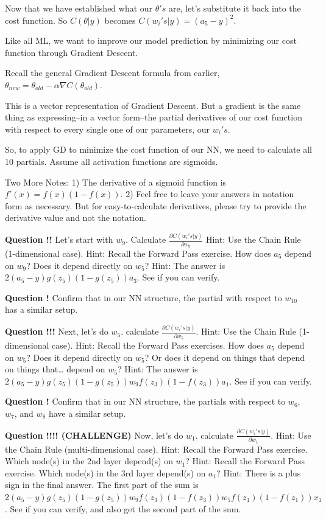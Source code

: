 \documentclass[
]{article}
\begin{document}
Now that we have established what our \(\theta's\) are, let's substitute
it back into the cost function. So \(C(\theta|y)\) becomes
\(C(w_i's|y) = (a_5 - y)^2\).

Like all ML, we want to improve our model prediction by minimizing our
cost function through Gradient Descent.

Recall the general Gradient Descent formula from earlier,
\(\theta_{new} = \theta_{old} - \alpha \nabla C(\theta_{old})\).

This is a vector representation of Gradient Descent. But a gradient is
the same thing as expressing--in a vector form--the partial derivatives
of our cost function with respect to every single one of our parameters,
our \(w_i's\).

So, to apply GD to minimize the cost function of our NN, we need to
calculate all 10 partials. Assume all activation functions are sigmoids.

Two More Notes: 1) The derivative of a sigmoid function is
\(f'(x) = f(x)(1-f(x))\). 2) Feel free to leave your answers in notation
form as necessary. But for easy-to-calculate derivatives, please try to
provide the derivative value and not the notation.

\textbf{Question !!} Let's start with \(w_9\). Calculate
\(\frac{\partial C(w_i's|y)}{\partial w_9}\) Hint: Use the Chain Rule
(1-dimensional case). Hint: Recall the Forward Pass exercise. How does
\(a_5\) depend on \(w_9\)? Does it depend directly on \(w_5\)? Hint: The
answer is \(2(a_5-y)g(z_5)(1-g(z_5))a_3\). See if you can verify.

\textbf{Question !} Confirm that in our NN structure, the partial with
respect to \(w_{10}\) has a similar setup.

\textbf{Question !!!} Next, let's do \(w_5\). calculate
\(\frac{\partial C(w_i's|y)}{\partial w_5}\). Hint: Use the Chain Rule
(1-dimensional case). Hint: Recall the Forward Pass exercises. How does
\(a_5\) depend on \(w_5\)? Does it depend directly on \(w_5\)? Or does
it depend on things that depend on things that\ldots{} depend on
\(w_5\)? Hint: The answer is
\(2(a_5-y)g(z_5)(1-g(z_5))w_9f(z_3)(1-f(z_3))a_1\). See if you can
verify.

\textbf{Question !} Confirm that in our NN structure, the partials with
respect to \(w_6\), \(w_7\), and \(w_8\) have a similar setup.

\textbf{Question !!!! (CHALLENGE)} Now, let's do \(w_1\). calculate
\(\frac{\partial C(w_i's|y)}{\partial w_1}\). Hint: Use the Chain Rule
(multi-dimensional case). Hint: Recall the Forward Pass exercise. Which
node(s) in the 2nd layer depend(s) on \(w_1\)? Hint: Recall the Forward
Pass exercise. Which node(s) in the 3rd layer depend(s) on \(a_1\)?
Hint: There is a plus sign in the final answer. The first part of the
sum is
\(2(a_5-y)g(z_5)(1-g(z_5))w_9f(z_3)(1-f(z_3))w_5f(z_1)(1-f(z_1))x_1\).
See if you can verify, and also get the second part of the sum.
\end{document}
